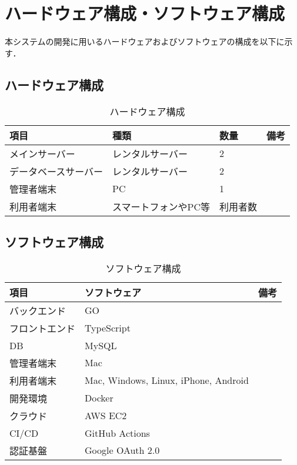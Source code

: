 \section{ハードウェア構成・ソフトウェア構成}
本システムの開発に用いるハードウェアおよびソフトウェアの構成を以下に示す．
\subsection{ハードウェア構成}
\begin{table}[]
    \centering
    \caption{ハードウェア構成}
    \label{tab:hardware}
    \begin{tabular}{llll}
    \hline
    項目         & 種類          & 数量   & 備考 \\ \hline
    メインサーバー    & レンタルサーバー    & 2    &    \\
    データベースサーバー & レンタルサーバー    & 2    &    \\
    管理者端末      & PC          & 1    &    \\
    利用者端末      & スマートフォンやPC等 & 利用者数 &    \\ \hline
    \end{tabular}
\end{table}

\subsection{ソフトウェア構成}
\begin{table}[]
    \centering
    \caption{ソフトウェア構成}
    \label{tab:software}
    \begin{tabular}{lll}
    \hline
    項目      & ソフトウェア                               & 備考 \\ \hline
    バックエンド  & GO                                   &    \\
    フロントエンド & TypeScript                           &    \\
    DB      & MySQL                                &    \\
    管理者端末   & Mac                  &    \\
    利用者端末   & Mac, Windows, Linux, iPhone, Android &    \\
    開発環境    & Docker                               &    \\
    クラウド    & AWS EC2                              &    \\
    CI/CD   & GitHub Actions                       &    \\
    認証基盤    & Google OAuth 2.0                     &    \\ \hline
    \end{tabular}
\end{table}